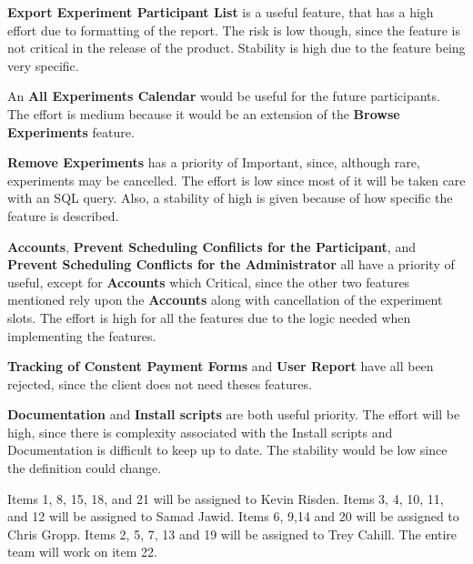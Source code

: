 \textbf{Export Experiment Participant List} is a useful feature, that has a high effort due to formatting of the report.  The risk is low though, since the feature is not critical in the release of the product.  Stability is high due to the feature being very specific.

An \textbf{All Experiments Calendar} would be useful for the future participants.  The effort is medium because it would be an extension of the \textbf{Browse Experiments} feature.

\textbf{Remove Experiments} has a priority of Important, since, although rare, experiments may be cancelled. The effort is low since most of it will be taken care with an \gls{SQL} query.  Also, a stability of high is given because of  how specific the feature is described.

\textbf{Accounts}, \textbf{Prevent Scheduling Confilicts for the Participant}, and \textbf{Prevent Scheduling Conflicts for the Administrator} all have a priority of useful, except for \textbf{Accounts} which Critical, since the other two features mentioned rely upon the \textbf{Accounts} along with cancellation of the experiment slots.  The effort is high for all the features due to the logic needed when implementing the features.  

\textbf{Tracking of Constent Payment Forms} and \textbf{User Report} have all been rejected, since the client does not need theses features.

\textbf{Documentation} and \textbf{Install scripts} are both useful priority.  The effort will be high, since there is complexity associated with the Install scripts and Documentation is difficult to keep up to date.  The stability would be low since the definition could change.

Items 1, 8, 15, 18, and 21 will be assigned to Kevin Risden.  Items 3, 4, 10, 11, and 12 will be assigned to Samad Jawid.  Items 6, 9,14 and 20  will be assigned to Chris Gropp.  Items 2, 5, 7, 13 and 19 will be assigned to Trey Cahill.  The entire team will work on item 22.

